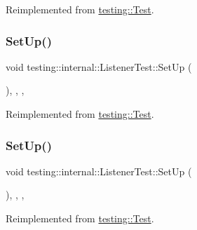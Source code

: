 Reimplemented from \mbox{\hyperlink{classtesting_1_1_test_a190315150c303ddf801313fd1a777733}{testing\+::\+Test}}.

\mbox{\label{classtesting_1_1internal_1_1_listener_test_a84f28c5bd517cdc07ec7b3d612fa6e30}} 
\subsubsection{\texorpdfstring{SetUp()}{SetUp()}\hspace{0.1cm}{\footnotesize\ttfamily [2/3]}}
{\footnotesize\ttfamily void testing\+::internal\+::\+Listener\+Test\+::\+Set\+Up (\begin{DoxyParamCaption}{ }\end{DoxyParamCaption})\hspace{0.3cm}{\ttfamily [inline]}, {\ttfamily [override]}, {\ttfamily [protected]}, {\ttfamily [virtual]}}



Reimplemented from \mbox{\hyperlink{classtesting_1_1_test_a190315150c303ddf801313fd1a777733}{testing\+::\+Test}}.

\mbox{\label{classtesting_1_1internal_1_1_listener_test_a84f28c5bd517cdc07ec7b3d612fa6e30}} 
\subsubsection{\texorpdfstring{SetUp()}{SetUp()}\hspace{0.1cm}{\footnotesize\ttfamily [3/3]}}
{\footnotesize\ttfamily void testing\+::internal\+::\+Listener\+Test\+::\+Set\+Up (\begin{DoxyParamCaption}{ }\end{DoxyParamCaption})\hspace{0.3cm}{\ttfamily [inline]}, {\ttfamily [override]}, {\ttfamily [protected]}, {\ttfamily [virtual]}}



Reimplemented from \mbox{\hyperlink{classtesting_1_1_test_a190315150c303ddf801313fd1a777733}{testing\+::\+Test}}.

